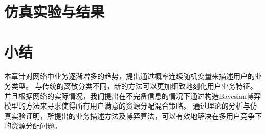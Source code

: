 \section{仿真实验与结果}

\section{小结}
本章针对网络中业务逐渐增多的趋势，提出通过概率连续随机变量来描述用户的业务类型。
与传统的离散分类不同，新的方法可以更加细致地刻化用户业务特征。
并且根据网络的实际情况，我们提出在不完备信息的情况下通过构造Bayesian博弈模型的方法来寻求使得所有用户满意的资源分配混合策略。
通过理论的分析与仿真实验证明，所提出的业务描述方法及博弈算法，可以有效地解决在多用户竞争下的资源分配问题。


